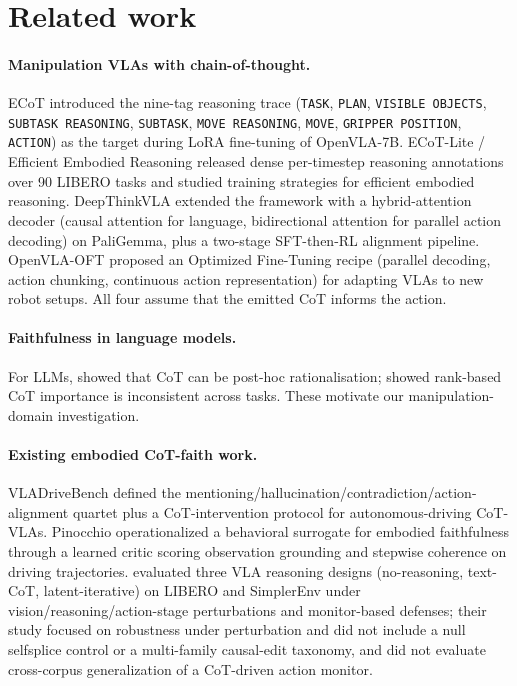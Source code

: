 \documentclass{article}
\begin{document}
\section{Related work}
\label{sec:related}

\paragraph{Manipulation VLAs with chain-of-thought.}
ECoT \citep{ecot} introduced the nine-tag reasoning trace (\texttt{TASK}, \texttt{PLAN}, \texttt{VISIBLE OBJECTS}, \texttt{SUBTASK REASONING}, \texttt{SUBTASK}, \texttt{MOVE REASONING}, \texttt{MOVE}, \texttt{GRIPPER POSITION}, \texttt{ACTION}) as the target during LoRA fine-tuning of OpenVLA-7B. ECoT-Lite / Efficient Embodied Reasoning \citep{ecotlite} released dense per-timestep reasoning annotations over 90 LIBERO tasks and studied training strategies for efficient embodied reasoning. DeepThinkVLA \citep{deepthinkvla} extended the framework with a hybrid-attention decoder (causal attention for language, bidirectional attention for parallel action decoding) on PaliGemma, plus a two-stage SFT-then-RL alignment pipeline. OpenVLA-OFT \citep{openvlaoft} proposed an Optimized Fine-Tuning recipe (parallel decoding, action chunking, continuous action representation) for adapting VLAs to new robot setups. All four assume that the emitted CoT informs the action.

\paragraph{Faithfulness in language models.}
For LLMs, \citet{turpin2023} showed that CoT can be post-hoc rationalisation; \citet{lanham2023} showed rank-based CoT importance is inconsistent across tasks. These motivate our manipulation-domain investigation.

\paragraph{Existing embodied CoT-faith work.}
VLADriveBench \citep{vladrivebench} defined the mentioning/hallucination/contradiction/action-alignment quartet plus a CoT-intervention protocol for autonomous-driving CoT-VLAs. Pinocchio \citep{pinocchio} operationalized a behavioral surrogate for embodied faithfulness through a learned critic scoring observation grounding and stepwise coherence on driving trajectories. \citet{doubleedged} evaluated three VLA reasoning designs (no-reasoning, text-CoT, latent-iterative) on LIBERO and SimplerEnv under vision/reasoning/action-stage perturbations and monitor-based defenses; their study focused on robustness under perturbation and did not include a null selfsplice control or a multi-family causal-edit taxonomy, and did not evaluate cross-corpus generalization of a CoT-driven action monitor.
\end{document}
